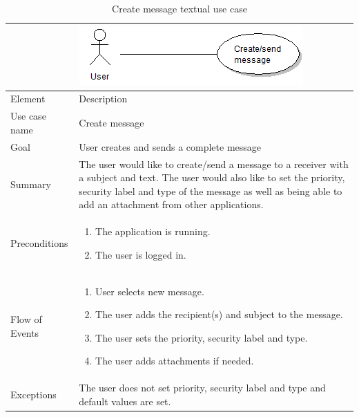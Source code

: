 \begin{table}
\begin{tabular}{p{3cm}p{12cm}}
& \includegraphics{create_message}\\ \hline
Element & Description \\ \hline
Use case name & Create message \\
Goal & User creates and sends a complete message \\
Summary &The user would like to create/send a message to a receiver with a subject and text. The user would also like to set the priority, security label and type of the message as well as being able to add an attachment from other applications. \\
Preconditions &
\begin{enumerate}
\item{}The application is running.
\item{}The user is logged in.
\end{enumerate} \\ \hline
Flow of Events &
\begin{enumerate}
\item{}User selects new message.
\item{}The user adds the recipient(s) and subject to the message.
\item{}The user sets the priority, security label and type.
\item{}The user adds attachments if needed.
\end{enumerate} \\ \hline
Exceptions & The user does not set priority, security label and type and default values are set.
\end{tabular}
\caption{Create message textual use case} \label{tab:createmessage}
\end{table}

